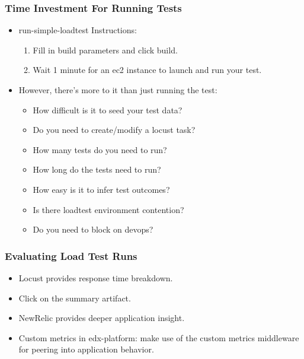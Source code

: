 \documentclass{beamer}
\begin{document}
\begin{frame}
\frametitle{Time Investment For Running Tests}
\begin{itemize}
\item run-simple-loadtest Instructions:\pause
      \begin{enumerate}
      \item Fill in build parameters and click build.\pause
      \item Wait 1 minute for an ec2 instance to launch and run your test.\pause
      \end{enumerate}
\item However, there's more to it than just running the test:\pause
      \begin{itemize}
      \item How difficult is it to seed your test data?\pause
      \item Do you need to create/modify a locust task?\pause
      \item How many tests do you need to run?\pause %
      \item How long do the tests need to run?\pause
      \item How easy is it to infer test outcomes?\pause %
      \item Is there loadtest environment contention?\pause
      \item Do you need to block on devops? %
      \end{itemize}
\end{itemize}
\end{frame}


\begin{frame}
\frametitle{Evaluating Load Test Runs}
\begin{itemize}
\item Locust provides response time breakdown.\pause
\item Click on the summary artifact.
      \pause
\item NewRelic provides deeper application insight.\pause
\item Custom metrics in edx-platform: make use of the custom metrics middleware
      for peering into application behavior.
\end{itemize}
\end{frame}
\end{document}
